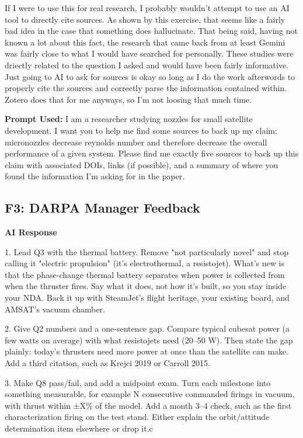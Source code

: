 If I were to use this for real research, I probably wouldn't attempt to use an AI tool to directly cite sources. As shown by this exercise, that seems like a fairly bad idea in the case that something does hallucinate. That being said, having not known a lot about this fact, the research that came back from at least Gemini was fairly close to what I would have searched for personally. These studies were driectly related to the question I asked and would have been fairly informative. Just going to AI to ask for sources is okay so long as I do the work afterwords to properly cite the sources and correctly parse the information contained within. Zotero does that for me anyways, so I'm not loosing that much time.

\begin{framed}
\textbf{Prompt Used:}
    I am a researcher studying nozzles for small satellite development. I want you to help me find some sources to back up my claim: micronozzles decrease reynolds number and therefore decrease the overall performance of a given system. Please find me exactly five sources to back up this claim with associated DOIs, links (if possible), and a summary of where you found the information I'm asking for in the paper.
\end{framed}

\subsection{F3: DARPA Manager Feedback}

\begin{framed}
    \textbf{AI Response}

    1. Lead Q3 with the thermal battery. Remove "not particularly novel" and stop calling it "electric propulsion" (it's electrothermal, a resistojet). What's new is that the phase-change thermal battery separates when power is collected from when the thruster fires. Say what it does, not how it's built, so you stay inside your NDA. Back it up with SteamJet's flight heritage, your existing board, and AMSAT's vacuum chamber.

    2. Give Q2 numbers and a one-sentence gap. Compare typical cubesat power (a few watts on average) with what resistojets need (20–50 W). Then state the gap plainly: today's thrusters need more power at once than the satellite can make. Add a third citation, such as Krejci 2019 or Carroll 2015.

    3. Make Q8 pass/fail, and add a midpoint exam. Turn each milestone into something measurable, for example N consecutive commanded firings in vacuum, with thrust within ±X\% of the model. Add a month 3–4 check, such as the first characterization firing on the test stand. Either explain the orbit/attitude determination item elsewhere or drop it.c
\end{framed}

